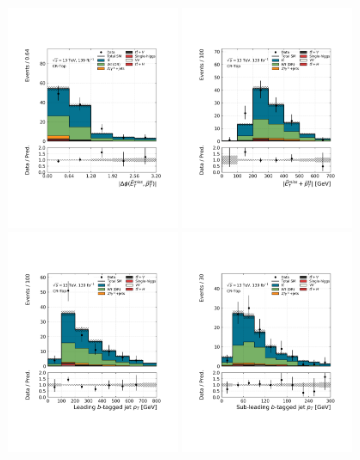 \begin{figure}[!htb]
    \centering
    \includegraphics[width=0.4\textwidth]{figures/search_hh/bkg_estimate/crvr/crtop/crtoptest_dphi_met_ll}
    \includegraphics[width=0.4\textwidth]{figures/search_hh/bkg_estimate/crvr/crtop/crtoptest_met_pTll}
    \includegraphics[width=0.4\textwidth]{figures/search_hh/bkg_estimate/crvr/crtop/crtoptest_bj0_pt}
    \includegraphics[width=0.4\textwidth]{figures/search_hh/bkg_estimate/crvr/crtop/crtoptest_bj1_pt}

\end{figure}
